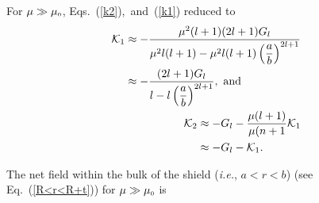 For $\mu\gg\mu_{\scriptscriptstyle 0}$, Eqs.~(\ref{k2}),~and~(\ref{k1}) reduced to
\begin{align}
    \begin{split}\label{k11}
        \mathcal{K}_1 & \approx-\frac{\mu^2(l+1) (2l+1)G_l}{\mu^2 l(l+1)-\mu^2 l(l+1)\left(\dfrac{a}{b}\right)^{2l+1}}\\
        & \approx-\frac{(2l+1)G_l}{l-l\left(\dfrac{a}{b}\right)^{2l+1}}{\rm ,~and}
    \end{split}\\
    \begin{split}\label{k21}
        \mathcal{K}_2 & \approx-G_l-\frac{\mu(l+1)}{\mu(n+1}\mathcal{K}_1\\
        & \approx-G_l-\mathcal{K}_1{\rm .}
    \end{split}
\end{align}


The net field  within the bulk of the shield (\textit{i.e.}, $a<r<b$) (see Eq.~(\ref{R<r<R+t})) for \(\mu\gg\mu_{\scriptscriptstyle 0}\) is 



